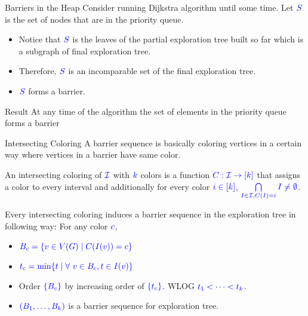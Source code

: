 \documentclass[10pt, handout]{beamer}
\begin{document}
\begin{frame}{Barriers in the Heap}
	Consider running Dijkstra algorithm until some time. Let $\mathcolor{blue}{S}$ is the set of nodes that are in the priority queue.\pause
	\begin{itemize}
		\item Notice that $\mathcolor{blue}{S}$ is the leaves of the partial exploration tree built so far which is a subgraph of final exploration tree.\pause
		\item Therefore, $\mathcolor{blue}{S}$ is an incomparable set of the final exploration tree.
		\item $\mathcolor{blue}{S}$ forms a barrier.
	\end{itemize}\pause \vfill

	\begin{alertblock}{Result}
		At any time of the algorithm the set of elements in the priority queue forms a barrier
	\end{alertblock}
\end{frame}
\begin{frame}{Intersecting Coloring}
	A barrier sequence is basically coloring vertices in a certain way where vertices in a barrier have same color.\pause
	\begin{definition}
		An intersecting coloring of $\mathcolor{blue}{\mathcal{I}}$ with $\mathcolor{blue}{k}$ colors is a function $\mathcolor{blue}{C:\mathcal{I}\to [k]}$ that assigns a color to every interval and additionally for every color $\mathcolor{blue}{i\in[k]}$, $\mathcolor{blue}{\bigcap\limits_{I\in\mathcal{I}, C(I)=i}I\neq \emptyset}$.
	\end{definition}\pause \vfill

	Every intersecting coloring induces a barrier sequence in the exploration tree in following way: For any color $\mathcolor{blue}{c}$,\pause
	\begin{itemize}
		\item  $\mathcolor{blue}{B_c=\{v\in V(G)\mid C(I(v))=c\}}$\pause
		\item $\mathcolor{blue}{t_c=\min\{t\mid \forall\ v\in B_c, t\in I(v)\}}$\pause
		\item Order $\mathcolor{blue}{\{B_c\}}$ by increasing order of $\mathcolor{blue}{\{t_c\}}$. WLOG $\mathcolor{blue}{t_1<\cdots <t_k}$.\pause
		\item $\mathcolor{blue}{(B_1,\dots, B_k)}$ is a barrier sequence for exploration tree.
	\end{itemize}
\end{frame}
\end{document}
